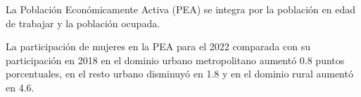La Población Económicamente Activa (PEA) se integra por la población en edad de trabajar y la población ocupada. 

La participación de mujeres en la PEA para el 2022 comparada con su participación en 2018 en el dominio urbano metropolitano aumentó 0.8 puntos porcentuales, en el resto urbano disminuyó en 1.8 y en el dominio rural aumentó en 4.6.

